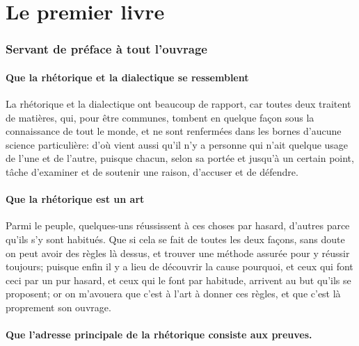 
\part{Le premier livre}
\section{Servant de préface à tout l'ouvrage}

\subsection{Que la rhétorique et la dialectique se  ressemblent}

La rhétorique et la dialectique  ont beaucoup de rapport, car  toutes deux traitent de matières, qui, pour être communes, tombent
en quelque façon sous la connaissance de tout le monde, et ne sont renfermées dans les bornes d'aucune science particulière: d'où
vient aussi qu'il n'y a personne qui n'ait quelque usage de l'une et de l'autre, puisque chacun, selon sa portée et jusqu'à un
certain point, tâche d'examiner et de soutenir une raison, d'accuser et de défendre.

\subsection{Que la rhétorique est un art}

Parmi le peuple, quelques-uns réussissent à ces choses par hasard, d'autres parce qu'ils s'y sont habitués. Que si cela se fait
de toutes les deux façons, sans doute on peut avoir des règles là dessus, et trouver une méthode assurée pour y réussir toujours;
puisque enfin il y a lieu de découvrir la cause pourquoi, et ceux qui font ceci par un pur hasard, et ceux qui le font par habitude,
arrivent au but qu'ils se proposent; or on m'avouera que c'est à l'art à donner ces règles, et que c'est là proprement son ouvrage.

\subsection{Que l'adresse principale de la rhétorique consiste aux preuves.}

